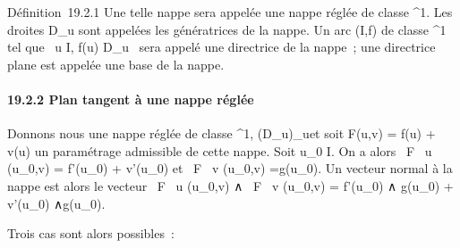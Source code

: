 \documentclass[]{article}
\begin{document}
Définition~19.2.1 Une telle nappe sera appelée une nappe réglée de
classe ^1. Les droites D\_u sont appelées les
génératrices de la nappe. Un arc (I,f) de classe ^1 tel que
\forall~u \in I, f(u) \in D\_u~ sera appelé une
directrice de la nappe~; une directrice plane est appelée une base de la
nappe.

\paragraph{19.2.2 Plan tangent à une nappe réglée}

Donnons nous une nappe réglée de classe ^1,
(D\_u)\_u\inI et soit F(u,v) = f(u) +
v\vecg(u) un paramétrage admissible de cette nappe.
Soit u\_0 \in I. On a alors  \partial~F \over \partial~u
(u\_0,v) = f'(u\_0) +
v\vecg'(u\_0) et  \partial~F \over
\partial~v (u\_0,v) =\vec g(u\_0). Un
vecteur normal à la nappe est alors le vecteur  \partial~F
\over \partial~u (u\_0,v) ∧ \partial~F \over
\partial~v (u\_0,v) = f'(u\_0) ∧\vec
g(u\_0) + v\vecg'(u\_0)
∧\vec g(u\_0).

Trois cas sont alors possibles~:
\end{document}
